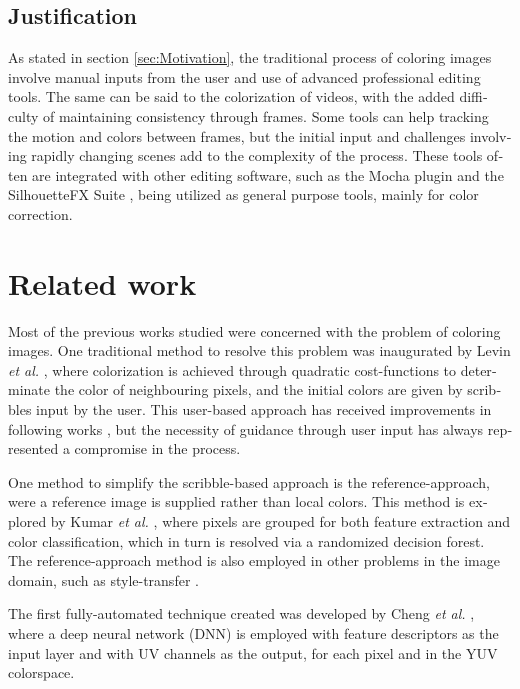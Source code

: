 \documentclass[12pt,openright,oneside,a4paper,english]{abntex2}
\begin{document}
\begin{otherlanguage}{english}
\section{Justification}
As stated in section \ref{sec:Motivation}, the traditional process of coloring images involve manual inputs from the user and use of advanced professional editing tools.
The same can be said to the colorization of videos, with the added difficulty of maintaining consistency through frames. Some tools can help tracking the motion and colors between frames, but the initial input and challenges involving rapidly changing scenes add to the complexity of the process. These tools often are integrated with other editing software, such as the Mocha plugin \cite{mocha} and the SilhouetteFX Suite \cite{silhoutte}, being utilized as general purpose tools, mainly for color correction.

\chapter{Related work}
Most of the previous works studied were concerned with the problem of coloring images. One traditional method to resolve this problem was inaugurated by Levin  \textit{et al.} \cite{Levin2004},
where colorization is achieved through quadratic cost-functions to determinate the color of neighbouring pixels, and the initial colors are given by scribbles input by the user. This user-based approach has received improvements in following works \cite{Huang2005} \cite{Kumar2012},
but the necessity of guidance through user input has always represented a compromise in the process.

One method to simplify the scribble-based approach is the reference-approach, were a reference image is supplied rather than local colors. This method is explored by Kumar \textit{et al.} \cite{Kumar2012},
where pixels are grouped for both feature extraction and color classification, which in turn is resolved via a randomized decision forest. The reference-approach method is also employed in other problems in the image domain, such as style-transfer \cite{Ruder2016}.

The first fully-automated technique created was developed by Cheng \textit{et al.} \cite{Cheng2015},
where a deep neural network (DNN) is employed with feature descriptors as the input layer and with UV channels as the output, for each pixel and in the YUV colorspace.


\end{otherlanguage}
\end{document}
